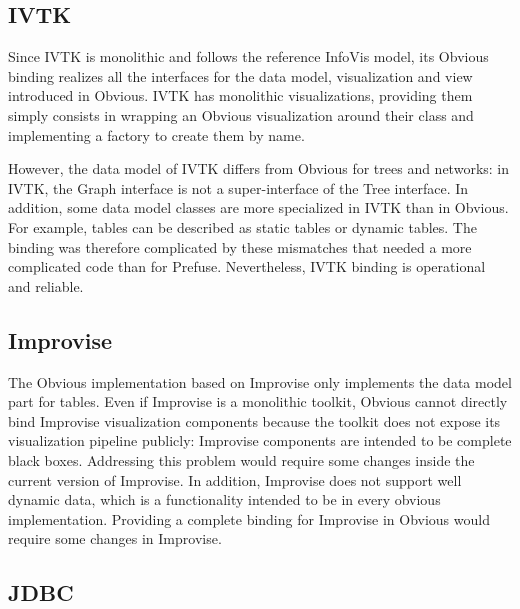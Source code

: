 
\subsection{IVTK}

Since IVTK is monolithic and follows the reference
InfoVis model, its Obvious binding realizes all the
interfaces for the data model, visualization and view introduced in
Obvious. IVTK has monolithic visualizations, providing
them simply consists in wrapping an Obvious visualization around their
class and implementing a factory to create them by name.

However, the data model of IVTK differs from Obvious
for trees and networks: in IVTK, the Graph interface is
not a super-interface of the Tree interface.  In addition, some data
model classes are more specialized in IVTK than in
Obvious.  For example, tables can be described as static tables or
dynamic tables.  The binding was therefore complicated by these
mismatches that needed a more complicated code than for Prefuse.
Nevertheless, IVTK binding is operational and
reliable.

\subsection{Improvise}

The Obvious implementation based on Improvise only
implements the data model part for tables.  Even if Improvise is a
monolithic toolkit, Obvious cannot directly bind Improvise
visualization components because the toolkit does not expose its
visualization pipeline publicly: Improvise components are intended to
be complete black boxes.  Addressing this problem would require some
changes inside the current version of Improvise. In addition,
Improvise does not support well dynamic data, which is a functionality
intended to be in every obvious implementation.
Providing a complete binding for Improvise in Obvious would
require some changes in Improvise.

\subsection{JDBC}

